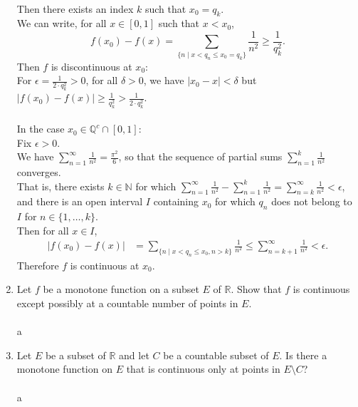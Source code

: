 \begin{enumerate}
    \\Then there exists an index $k$ such that $x_0=q_k$.
    \\We can write, for all $x\in[0,1]$ such that $x<x_0$,
    \[
        f(x_0)-f(x)=\sum_{\{n\mid x<q_n\le x_0=q_k\}}\frac{1}{n^2}\ge\frac{1}{q_k^2}.
    \]
    Then $f$ is discontinuous at $x_0$:
    \\For $\epsilon=\frac{1}{2\cdot q_k^2}>0$, for all $\delta>0$, we have $|x_0-x|<\delta$ but $|f(x_0)-f(x)|\ge\frac{1}{q_k^2}>\frac{1}{2\cdot q_k^2}$.\\
    \\In the case $x_0\in\mathbb{Q}^c\cap[0,1]$:
    \\Fix $\epsilon>0$.
    \\We have $\sum_{n=1}^\infty\frac{1}{n^2}=\frac{\pi^2}{6}$, so that the sequence of partial sums $\sum_{n=1}^k\frac{1}{n^2}$ converges.
    \\That is, there exists $k\in\mathbb{N}$ for which $\sum_{n=1}^\infty\frac{1}{n^2}-\sum_{n=1}^k\frac{1}{n^2}=\sum_{n=k}^\infty\frac{1}{n^2}<\epsilon$, and there is an open interval $I$ containing $x_0$ for which $q_n$ does not belong to $I$ for $n\in\{1,\dots,k\}$.
    \\Then for all $x\in I$,
    \begin{align*}
        |f(x_0)-f(x)|&=\sum_{\{n\mid x< q_n\le x_0,n>k\}}\frac{1}{n^2}
        \le\sum_{n={k+1}}^\infty\frac{1}{n^2}
        <\epsilon.
    \end{align*}
    Therefore $f$ is continuous at $x_0$.
    \item Let $f$ be a monotone function on a subset $E$ of $\mathbb{R}$. Show that $f$ is continuous except possibly at a countable number of points in $E$.\\
    \\a
    \item Let $E$ be a subset of $\mathbb{R}$ and let $C$ be a countable subset of $E$. Is there a monotone function on $E$ that is continuous only at points in $E\setminus C$?\\
    \\a
\end{enumerate}

